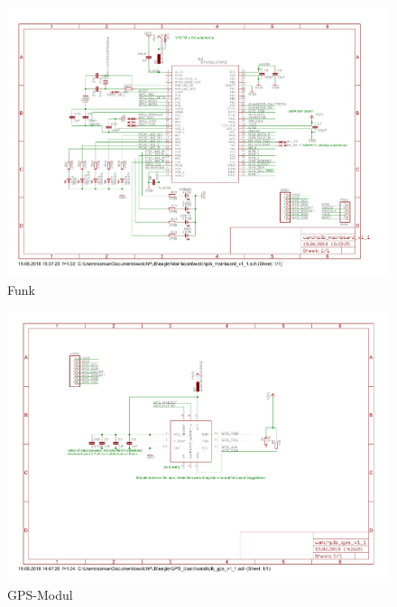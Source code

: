 \documentclass[a4paper]{scrartcl}
\begin{document}
\begin{figure}[htb]\centering
\includegraphics[page=8, angle=90, width=\linewidth]{../Mainboard/watchplb_mainboard_v1_1.pdf}
\caption{Funk}
\label{fig:abb1}
\end{figure}

\begin{figure}[htb]\centering
\includegraphics[page=1, angle=90, width=\linewidth]{../GPS_board/watchplb_gps_v1_1.pdf}
\caption{GPS-Modul}
\label{fig:abb1}
\end{figure}
\end{document}
